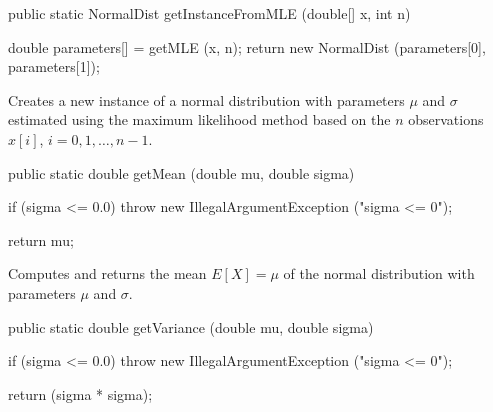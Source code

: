 \begin{htmlonly}
\end{htmlonly}
\begin{code}

   public static NormalDist getInstanceFromMLE (double[] x, int n)\begin{hide} {
      double parameters[] = getMLE (x, n);
      return new NormalDist (parameters[0], parameters[1]);
   }\end{hide}
\end{code}
\begin{tabb}
   Creates a new instance of a normal distribution with parameters $\mu$ and $\sigma$
   estimated using the maximum likelihood method based on the $n$ observations
   $x[i]$, $i = 0, 1, \ldots, n-1$.
\end{tabb}
\begin{htmlonly}
\end{htmlonly}
\begin{code}

   public static double getMean (double mu, double sigma)\begin{hide} {
      if (sigma <= 0.0)
         throw new IllegalArgumentException ("sigma <= 0");

      return mu;
   }\end{hide}
\end{code}
\begin{tabb}  Computes and returns the mean $E[X] = \mu$ of the normal distribution
   with parameters $\mu$ and $\sigma$.
\end{tabb}
\begin{htmlonly}
\end{htmlonly}
\begin{code}

   public static double getVariance (double mu, double sigma)\begin{hide} {
      if (sigma <= 0.0)
         throw new IllegalArgumentException ("sigma <= 0");

      return (sigma * sigma);
   }\end{hide}
\end{code}
